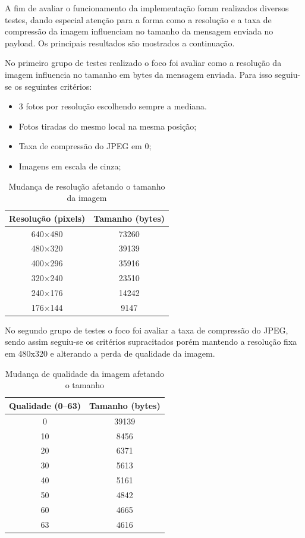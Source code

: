\documentclass[
article,			%
12pt,				%
oneside,			%
a4paper,			%
english,			%
brazil,				%
sumario=tradicional
]{abntex2}
\begin{document}
A fim de avaliar o funcionamento da implementação foram realizados diversos testes, dando especial atenção para a forma como a resolução e a taxa de compressão da imagem influenciam no tamanho da mensagem enviada no payload. Os principais resultados são mostrados a continuação.

No primeiro grupo de testes realizado o foco foi avaliar como a resolução da imagem influencia no tamanho em bytes da mensagem enviada. Para isso seguiu-se os seguintes critérios:
\begin{itemize}
    \setlength\itemsep{0.01cm}
    \item 3 fotos por resolução escolhendo sempre a mediana.
    \item Fotos tiradas do mesmo local na mesma posição;
    \item Taxa de compressão do JPEG em 0;
    \item Imagens em escala de cinza;
\end{itemize}

\begin{table}[!h]
\centering
\begin{tabular}{@{}c|c@{}}
\toprule
Resolução (pixels) & Tamanho (bytes) \\ \midrule
640$\times$480            & 73260           \\
480$\times$320            & 39139           \\
400$\times$296            & 35916           \\
320$\times$240            & 23510           \\
240$\times$176            & 14242           \\
176$\times$144            & 9147            \\ \bottomrule
\end{tabular}
\caption{Mudança de resolução afetando o tamanho da imagem}
\label{tab:resolution}
\end{table}

No segundo grupo de testes o foco foi avaliar a taxa de compressão do JPEG, sendo assim seguiu-se os critérios supracitados porém mantendo a resolução fixa em 480x320 e alterando a perda de qualidade da imagem.

\begin{table}[!h]
\centering
\begin{tabular}{@{}c|c@{}}
\toprule
Qualidade (0--63) & Tamanho (bytes) \\ \midrule
0                & 39139           \\
10               & 8456            \\
20               & 6371            \\
30               & 5613            \\
40               & 5161            \\
50               & 4842            \\
60               & 4665            \\
63               & 4616            \\ \bottomrule
\end{tabular}
\caption{Mudança de qualidade da imagem afetando o tamanho}
\label{tab:quality}
\end{table}
\end{document}
